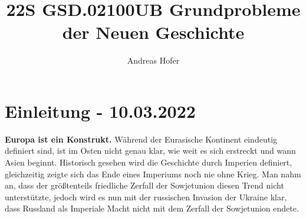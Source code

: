 \documentclass{article}
\title{22S GSD.02100UB Grundprobleme der Neuen Geschichte}
\author{Andreas Hofer}
\begin{document}
	\section{Einleitung - 10.03.2022}
	\textbf{Europa ist ein Konstrukt.} Während der Eurasische Kontinent eindeutig definiert sind, ist im Osten nicht genau klar, wie weit es sich erstreckt und wann Asien beginnt. Historisch gesehen wird die Geschichte durch Imperien definiert, gleichzeitig zeigte sich das Ende eines Imperiums noch nie ohne Krieg. Man nahm an, dass der größtenteils friedliche Zerfall der Sowjetunion diesen Trend nicht unterstützte, jedoch wird es nun mit der russischen Invasion der Ukraine klar, dass Russland als Imperiale Macht nicht mit dem Zerfall der Sowjetunion endete. \\
	

























	
\end{document}
